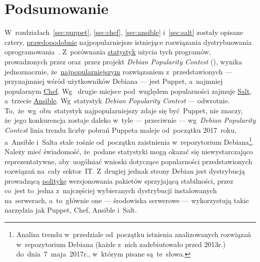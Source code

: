 \documentclass[thesis]{subfiles}
\begin{document}

\section{Podsumowanie}

W~rozdziałach~\ref{sec:puppet}, \ref{sec:chef}, \ref{sec:ansible} i~\ref{sec:salt} zostały opisane cztery, \href{http://www.infoworld.com/article/2609482/data-center/data-center-review-puppet-vs-chef-vs-ansible-vs-salt.html}{prawdopodobnie} najpopularniejsze istniejące rozwiązania dystrybuowania oprogramowania~\cite{leading-scms}. Z~porównania \href{https://www.openhub.net/p/_compare?project_0=Puppet&project_2=salt&project_1=Ansible}{statystyk} użycia tych programów, prowadzonych przez  oraz~przez projekt \emph{Debian Popularity Contest} (), wynika jednoznacznie, że~\href{https://qa.debian.org/popcon.php?package=puppet}{najpopularniejszym} rozwiązaniem z~przedstawionych --- przynajmniej wśród użytkowników Debiana --- jest Puppet, a~najmniej popularnym \href{https://qa.debian.org/popcon.php?package=chef}{Chef}. Wg~ drugie miejsce pod~względem popularności zajmuje \href{https://qa.debian.org/popcon.php?package=salt}{Salt}, a~trzecie \href{https://qa.debian.org/popcon.php?package=ansible}{Ansible}. Wg~statystyk \emph{Debian Popularity Contest} --- odwrotnie. To,~że~wg~obu~statystyk najpopularniejszy zdaje się być~Puppet, nie znaczy, że~jego konkurencja zostaje daleko w~tyle --- przeciwnie --- wg~\emph{Debian Popularity Contest} linia trendu liczby pobrań Puppeta maleje od~początku 2017~roku, a~Ansible i~Salta stale rośnie od~początku zaistnienia w~repozytorium Debiana\footnote{Analiza trendu w~przedziale od~początku istnienia analizowanych rozwiązań w~repozytorium Debiana (każde z~nich zadebiutowało przed 2013r.) do~dnia~7~maja~2017r., w~którym pisane są~te~słowa.}. Należy mieć świadomość, że~podane statystyki mogą okazać się niewystarczająco reprezentatywne, aby~uogólniać wnioski dotyczące popularności przedstawionych rozwiązań na~cały sektor~IT. Z~drugiej jednak strony Debian jest dystrybucją prowadzącą \href{https://www.debian.org/doc/manuals/debian-faq/ch-ftparchives#s-frozen}{politykę} wersjonowania pakietów sprzyjającą stabilności, przez co~jest to~jedna z~najczęściej wybieranych dystrybucji  instalowanych na~serwerach, a~to~głównie one --- środowiska serwerowe --- wykorzystują takie narzędzia jak Puppet, Chef, Ansible i~Salt.
\end{document}
